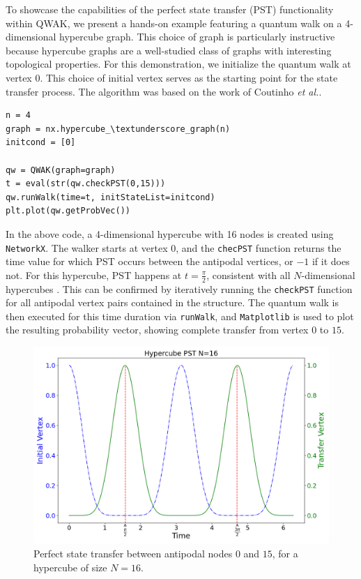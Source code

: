 \documentclass[main.tex]{subfiles}
\begin{document}
To showcase the capabilities of the perfect state transfer (PST) functionality
within QWAK, we present a hands-on example featuring a quantum walk on a
4-dimensional hypercube graph. This choice of graph is particularly instructive
because hypercube graphs are a well-studied class of graphs with interesting
topological properties. For this demonstration, we initialize the quantum walk
at vertex $0$. This choice of initial vertex serves as the starting point for
the state transfer process. The algorithm was based on the work of Coutinho \textit{et al.}\cite{coutinho17}.

\begin{lstlisting}[style=code,escapeinside={__}]
n = 4
graph = nx.hypercube_\textunderscore_graph(n)
initcond = [0]

qw = QWAK(graph=graph)
t = eval(str(qw.checkPST(0,15)))
qw.runWalk(time=t, initStateList=initcond)
plt.plot(qw.getProbVec())
\end{lstlisting}

In the above code, a 4-dimensional hypercube with 16 nodes is created using
\texttt{NetworkX}. The walker starts at vertex 0, and the \texttt{checPST}
function returns the time value for which PST occurs between the antipodal
vertices, or $-1$ if it does not. For this hypercube, PST happens at $t =
\frac{\pi}{2}$, consistent with all $N$-dimensional hypercubes
\cite{christandlPerfect04,Christandl2005}. This can be confirmed by iteratively
running the \texttt{checkPST} function for all antipodal vertex pairs contained
in the structure. The quantum walk is then executed for this time duration via
\texttt{runWalk}, and \texttt{Matplotlib} is used to plot the resulting
probability vector, showing complete transfer from vertex $0$ to $15$.\par

\begin{figure}[!h]
    \centering
    \includegraphics[scale=\mysinglefigurescale]{Hypercube_N16_T6.28_FROM0_TO15.png}
    \caption{Perfect state transfer between antipodal nodes $0$ and $15$, for a hypercube of size $N=16$.}
    \label{fig:hypercube_pst}
\end{figure}
\end{document}
